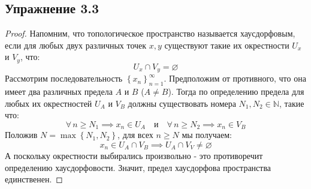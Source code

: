\documentclass[a4paper]{article}
\begin{document}
\subsection*{Упражнение 3.3}
\begin{proof}
Напомним, что топологическое пространство называется хаусдорфовым, если для любых двух различных точек $x, y$ существуют такие их окрестности $U_x$ и $V_y$, что:
\[U_x \cap V_y = \varnothing\]
Рассмотрим последовательность $\left\{ x_n \right\}_{n=1}^{\infty}$. Предположим от противного, что она имеет два различных предела $A$ и $B$ ($A \ne B$). Тогда по определению предела для любых их окрестностей $U_A$ и $V_B$ должны существовать номера $N_1, N_2 \in \mathbb{N}$, такие что:\[
\forall \, n \ge N_1 \implies x_n \in U_A \quad \text{и} \quad \forall \, n \ge N_2 \implies x_n \in V_B\]
Положив $N = \max\left\{N_1, N_2\right\}$, для всех $n \ge N$ мы получаем:
\[x_n \in U_A \cap V_B \implies U_A \cap V_V \ne \varnothing\]
А поскольку окрестности выбирались произвольно - это противоречит определению хаусдорфовости. Значит, предел хаусдорфова пространства единственен.
\end{proof}
\end{document}

